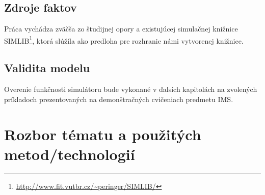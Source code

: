\documentclass[11pt, a4paper, titlepage]{article}
\begin{document}
\subsection{Zdroje faktov}
Práca vychádza zväčša zo študijnej opory\cite{opora} a existujúcej simulačnej knižnice SIMLIB\footnote{\url{http://www.fit.vutbr.cz/~peringer/SIMLIB/}}, ktorá slúžíla ako predloha pre rozhranie námi vytvorenej knižnice.

\subsection{Validita modelu}
Overenie funkčnosti simulátoru bude vykonané v ďalsích kapitolách na zvolených príkladoch prezentovaných na demonštračných cvičeniach
predmetu IMS.

\section{Rozbor tématu a použitých metod/technologií}

%
%
\end{document}

